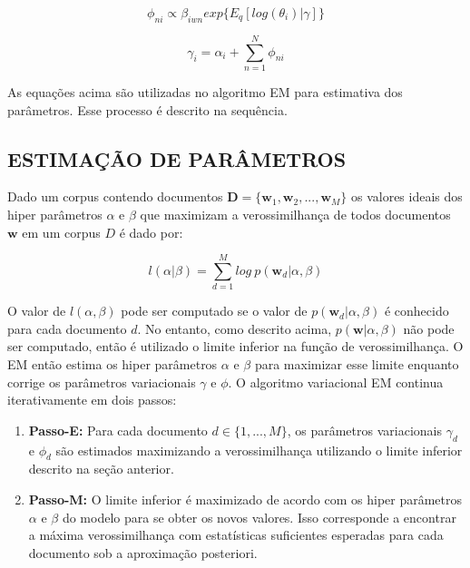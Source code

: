\documentclass[12pt,a4paper]{article}
\begin{document}
  \begin{equation}
  \phi_{ni} \propto \beta_{iwn} exp\{E_q[log(\theta_i)|\gamma]\}
  \end{equation}
  
  \begin{equation}
  \gamma_i = \alpha_i + \sum_{n=1}^{N} \phi_{ni}
  \end{equation}
  
  As equações acima são utilizadas no algoritmo EM para estimativa dos parâmetros. Esse processo é descrito na sequência.
  
  \subsection{ESTIMAÇÃO DE PARÂMETROS}
  Dado um corpus contendo documentos $\textbf{D} = \{\textbf{w}_1, \textbf{w}_2, . . ., \textbf{w}_M\}$ os valores ideais dos hiper parâmetros $\alpha$ e $\beta$
   que maximizam a verossimilhança de todos documentos $\textbf{w}$ em um corpus $D$ é dado por:
  
  \begin{equation}
  l(\alpha|\beta) = \sum_{d=1}^{M} log\ p(\textbf{w}_d|\alpha,\beta)
  \end{equation}
  
  O valor de $l(\alpha, \beta)$ pode ser computado se o valor de $p(\textbf{w}_d|\alpha, \beta)$ é conhecido para cada documento $d$. No entanto,
   como descrito acima, $p(\textbf{w}|\alpha,\beta)$ não pode ser computado, então é utilizado o limite inferior na função de verossimilhança.
   O EM então estima os hiper parâmetros $\alpha$ e $\beta$ para maximizar esse limite enquanto corrige os parâmetros variacionais $\gamma$ e $\phi$. 
   O algoritmo variacional EM continua iterativamente em dois passos:
  
  \begin{enumerate}
  \item \textbf{Passo-E:} Para cada documento $d \in \{1,. . . , M\}$, os parâmetros variacionais $\gamma_d$ e $\phi_d$ são estimados maximizando a verossimilhança utilizando o limite inferior descrito na seção anterior.
  \item \textbf{Passo-M:} O limite inferior é maximizado  de acordo com os hiper parâmetros $\alpha$ e $\beta$ do modelo para se obter os novos valores. 
   Isso corresponde a encontrar a máxima verossimilhança com estatísticas suficientes esperadas para cada documento sob a aproximação posteriori.
  \end{enumerate}
  
\end{document}
